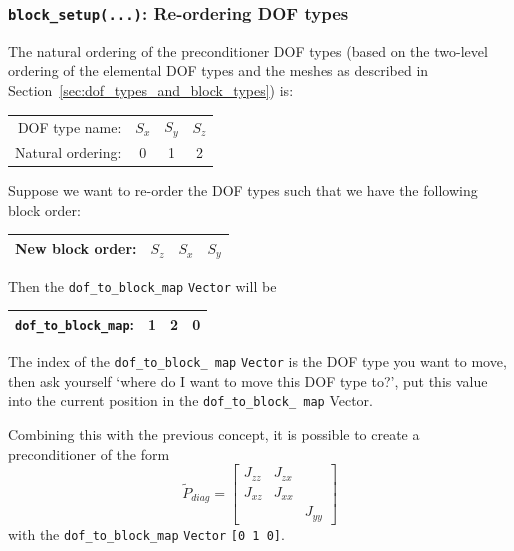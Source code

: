 \subsubsection{\texttt{block\_setup(...)}: Re-ordering DOF
  types\label{sec:block_setup_reordering_dof_types}} The natural ordering of
the preconditioner DOF types (based on the two-level ordering of the elemental
DOF types and the meshes as described in
Section~\ref{sec:dof_types_and_block_types}) is:
\begin{center}
    \begin{tabular}{ | r | c c c |}
    \hline
    DOF type name: & $S_{x}$ & $S_{y}$ & $S_{z}$ \\ 
    Natural ordering: & 0 & 1 & 2 \\ 
    \hline
    \end{tabular}
\end{center}
Suppose we want to re-order the DOF types such that we have the following block
order:
\begin{center}
    \begin{tabular}{ | r | c c c |}
    \hline
    New block order: & $S_{z}$ & $S_{x}$ & $S_{y}$ \\ 
    \hline
    \end{tabular}
\end{center}
Then the \texttt{dof\_\allowbreak to\_\allowbreak block\_\allowbreak map}
\texttt{Vector} will be
\begin{center}
    \begin{tabular}{ | r | c c c |}
    \hline
    \verb+dof_to_block_map+: & 1 & 2 & 0 \\ 
    \hline
    \end{tabular}
\end{center}
The index of the \texttt{dof\_\allowbreak to\_\allowbreak block\_\allowbreak
  map} \texttt{Vector} is the DOF type you want to move, then ask yourself
`where do I want to move this DOF type to?', put this value into the current
position in the \texttt{dof\_\allowbreak to\_\allowbreak block\_\allowbreak
  map} Vector.

Combining this with the previous concept, it is possible to create a preconditioner of the form
\begin{equation*}
\tilde{P}_{diag} =
\begin{bmatrix}
J_{zz}&J_{zx}&       \\
J_{xz}&J_{xx}&       \\
      &      &J_{yy}
\end{bmatrix}
\end{equation*}
with the \texttt{dof\_\allowbreak to\_\allowbreak block\_\allowbreak map}
\texttt{Vector} \texttt{[0 1 0]}.

